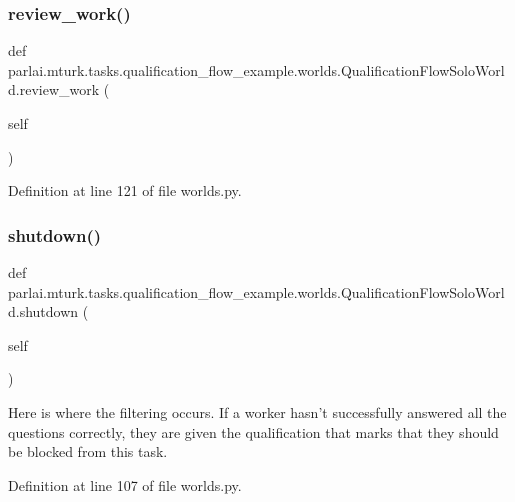 \subsubsection{\texorpdfstring{review\+\_\+work()}{review\_work()}}
{\footnotesize\ttfamily def parlai.\+mturk.\+tasks.\+qualification\+\_\+flow\+\_\+example.\+worlds.\+Qualification\+Flow\+Solo\+World.\+review\+\_\+work (\begin{DoxyParamCaption}\item[{}]{self }\end{DoxyParamCaption})}



Definition at line 121 of file worlds.\+py.

\mbox{\label{classparlai_1_1mturk_1_1tasks_1_1qualification__flow__example_1_1worlds_1_1QualificationFlowSoloWorld_a869c8ed34266cc3bcafb88975172807e}} 
\subsubsection{\texorpdfstring{shutdown()}{shutdown()}}
{\footnotesize\ttfamily def parlai.\+mturk.\+tasks.\+qualification\+\_\+flow\+\_\+example.\+worlds.\+Qualification\+Flow\+Solo\+World.\+shutdown (\begin{DoxyParamCaption}\item[{}]{self }\end{DoxyParamCaption})}

\begin{DoxyVerb}Here is where the filtering occurs. If a worker hasn't successfully
answered all the questions correctly, they are given the qualification
that marks that they should be blocked from this task.
\end{DoxyVerb}
 

Definition at line 107 of file worlds.\+py.



